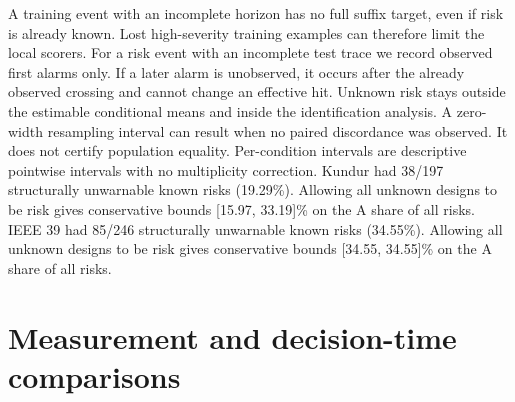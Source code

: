 \documentclass[10pt]{article}
\begin{document}
A training event with an incomplete horizon has no full suffix target, even if risk is already known. Lost high-severity training examples can therefore limit the local scorers. For a risk event with an incomplete test trace we record observed first alarms only. If a later alarm is unobserved, it occurs after the already observed crossing and cannot change an effective hit. Unknown risk stays outside the estimable conditional means and inside the identification analysis. A zero-width resampling interval can result when no paired discordance was observed. It does not certify population equality. Per-condition intervals are descriptive pointwise intervals with no multiplicity correction.
Kundur had 38/197 structurally unwarnable known risks (19.29\%). Allowing all unknown designs to be risk gives conservative bounds [15.97, 33.19]\% on the A share of all risks. IEEE 39 had 85/246 structurally unwarnable known risks (34.55\%). Allowing all unknown designs to be risk gives conservative bounds [34.55, 34.55]\% on the A share of all risks. 
\clearpage\section{Measurement and decision-time comparisons}
\begingroup\footnotesize\setlength{\tabcolsep}{4pt}
\end{document}
